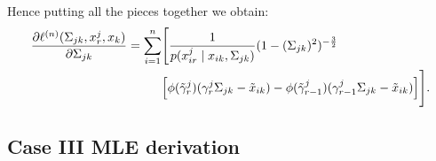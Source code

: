 Hence putting all the pieces together we obtain:
\begin{equation}\label{MLE_polyserial}
    \begin{split}
        \frac{\partial\ell^{(n)}(\Sigma_{jk}, x^j_r,x_k)}{\partial \Sigma_{jk}} = \sum_{i=1}^n &\Bigg[\frac{1}{p(x^j_{ir} \mid x_{ik}, \Sigma_{jk})} (1-(\Sigma_{jk})^2)^{-\frac{3}{2}} \\
        &\Big[\phi({\Tilde{\gamma}}^j_{r})({\gamma}^j_r\Sigma_{jk} - {\Tilde{x}}_{ik}) - \phi({\Tilde{\gamma}}^j_{r-1})({\gamma}^j_{r-1}\Sigma_{jk} - {\Tilde{x}}_{ik})\Big]\Bigg].
    \end{split}
\end{equation}

\subsection{Case III MLE derivation}

